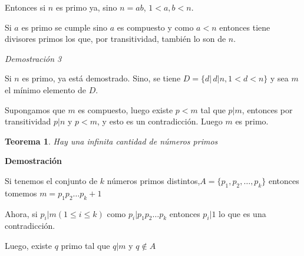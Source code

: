 \documentclass[a4paper,1pt]{report}
\newtheorem*{teo}{Teorema}
\begin{document}
Entonces si $n$ es primo ya, sino $n=ab$, $1<a,b<n$.

Si $a$ es primo se cumple sino $a$ es compuesto y como $a<n$ entonces tiene divisores primos los que, por transitividad, también lo son de $n$.

\textit{Demostración 3}

Si $n$ es primo, ya está demostrado.
Sino, se tiene $D=\{d|\, d|n, 1<d<n\}$ y sea $m$ el mínimo elemento de $D$. 

Supongamos que $m$ es compuesto, luego existe $p<m$ tal que $p|m$, entonces por transitividad $p|n$ y $p<m$, y esto es un contradicción. Luego $m$ es primo.

\begin{teo}
 Hay una infinita cantidad de números primos
\end{teo}

\textbf{Demostración}

Si tenemos el conjunto de $k$ números primos distintos,$A=\{p_1,p_2,\dots ,p_k\}$
entonces tomemos $m=p_1p_2\dots p_k+1$

Ahora, si $p_i|m (1\leq i\leq k)$ como $p_i|p_1p_2\dots p_k$  entonces $p_i|1$ lo que es una contradicción.

Luego, existe $q$ primo tal que $q|m$ y $q\not\in A$
\end{document}
